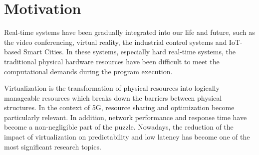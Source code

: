 \section{Motivation}
Real-time systems have been gradually integrated into our life and future, such as
the video conferencing, virtual reality, the industrial control systems and
IoT-based Smart Cities\cite{b19}.
In these systems, especially hard real-time systems, the traditional physical hardware
resources have been difficult to meet the computational demands during the program execution.

Virtualization is the transformation of physical resources into logically
manageable resources which breaks down the barriers between physical structures.
In the context of 5G, resource sharing and optimization become particularly relevant.
In addition, network performance and response time have become a non-negligible part
of the puzzle.
Nowadays, the reduction of the impact of virtualization on predictability and low latency
has become one of the most significant research topics\cite{b13}.
